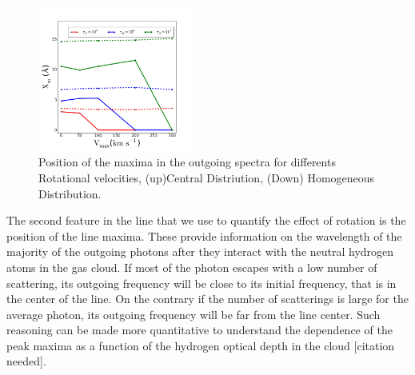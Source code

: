\documentclass[usenatbib]{mn2e}
\begin{document}


\begin{figure}
    \includegraphics[width=0.45\textwidth]{maximumvsVmax.png}
\caption{Position of the maxima
    in the outgoing spectra for differents Rotational velocities,
    (up)Central Distriution, (Down) Homogeneous Distribution.\label{fig:maximumsvsvelocity}} 
\end{figure}



The second feature in the line that we use to quantify the effect of
rotation is the position of the line maxima. These provide information
on the wavelength of the majority of the outgoing photons after
they interact with the neutral hydrogen atoms in the gas cloud. If
most of the photon escapes with a low number of scattering, its
outgoing frequency will be close to its initial frequency, that is in
the center of the line. On the contrary if the number of scatterings
is large for the average photon, its outgoing frequency will be far
from the line center. Such reasoning can be made more quantitative to
understand the dependence of the peak maxima as a function of the
hydrogen optical depth in the cloud [citation needed].
\end{document}
